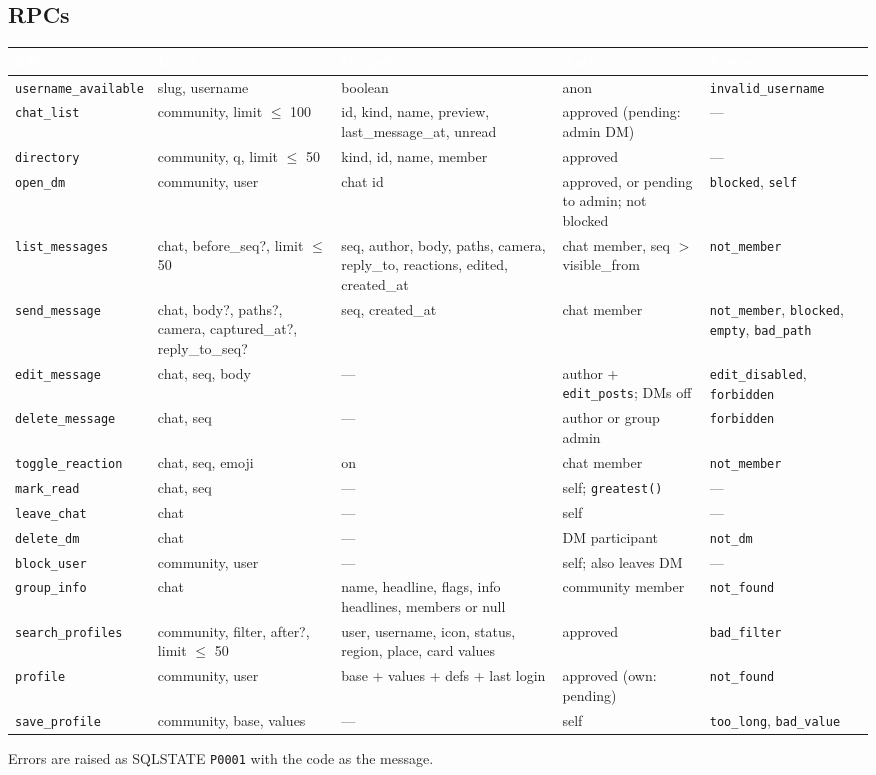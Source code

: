 \documentclass[11pt,a4paper]{article}
\newcommand{\hdr}[1]{\textcolor{white}{\textbf{#1}}}
\newcommand{\code}[1]{\texttt{\small #1}}
\begin{document}
\subsection{RPCs}
{\small
{}
\begin{longtable}{L{2.7cm} L{3.8cm} L{3.4cm} L{2.6cm} L{2.4cm}}
\hdr{RPC} & \hdr{Input} & \hdr{Output} & \hdr{Authz} & \hdr{Errors}\\
\endhead
\code{username\_available} & slug, username & boolean & anon & \code{invalid\_username}\\
\code{chat\_list} & community, limit $\le$ 100 & id, kind, name, preview, last\_message\_at, unread & approved (pending: admin DM) & ---\\
\code{directory} & community, q, limit $\le$ 50 & kind, id, name, member & approved & ---\\
\code{open\_dm} & community, user & chat id & approved, or pending to admin; not blocked & \code{blocked}, \code{self}\\
\code{list\_messages} & chat, before\_seq?, limit $\le$ 50 & seq, author, body, paths, camera, reply\_to, reactions, edited, created\_at & chat member, seq $>$ visible\_from & \code{not\_member}\\
\code{send\_message} & chat, body?, paths?, camera, captured\_at?, reply\_to\_seq? & seq, created\_at & chat member & \code{not\_member}, \code{blocked}, \code{empty}, \code{bad\_path}\\
\code{edit\_message} & chat, seq, body & --- & author + \code{edit\_posts}; DMs off & \code{edit\_disabled}, \code{forbidden}\\
\code{delete\_message} & chat, seq & --- & author or group admin & \code{forbidden}\\
\code{toggle\_reaction} & chat, seq, emoji & on & chat member & \code{not\_member}\\
\code{mark\_read} & chat, seq & --- & self; \code{greatest()} & ---\\
\code{leave\_chat} & chat & --- & self & ---\\
\code{delete\_dm} & chat & --- & DM participant & \code{not\_dm}\\
\code{block\_user} & community, user & --- & self; also leaves DM & ---\\
\code{group\_info} & chat & name, headline, flags, info headlines, members or null & community member & \code{not\_found}\\
\code{search\_profiles} & community, filter, after?, limit $\le$ 50 & user, username, icon, status, region, place, card values & approved & \code{bad\_filter}\\
\code{profile} & community, user & base + values + defs + last login & approved (own: pending) & \code{not\_found}\\
\code{save\_profile} & community, base, values & --- & self & \code{too\_long}, \code{bad\_value}\\
\end{longtable}
}
Errors are raised as SQLSTATE \code{P0001} with the code as the message.
\end{document}
